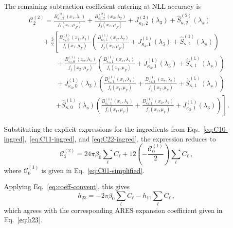 The remaining subtraction coefficient entering at NLL accuracy is
\begin{equation}
\begin{aligned}
&\mathcal{C}^{(2)}_2=\frac{B_{\kappa_1,2}^{(2)}(x_1,\lambda_1)}{f_i(x_1,\mu_F)}+\frac{B_{\kappa_2,2}^{(2)}(x_2,\lambda_2)}{f_j(x_2,\mu_F)}+
    J_{\kappa_3,2}^{(2)}(\lambda_3)
    +\widehat{S}^{(2)}_{\kappa,2}\left(\lambda_s\right)\\[0.5ex]
    &\qquad +\frac{3}{2}\left[\frac{B_{\kappa_1,0}^{(1)}(x_1,\lambda_1)}{f_i(x_1,\mu_F)}\left(\frac{B_{\kappa_2,1}^{(1)}(x_2,\lambda_2)}{f_j(x_2,\mu_F)}+J_{\kappa_3,1}^{(1)}(\lambda_3)
    +\widehat{S}^{(1)}_{\kappa,1}\left(\lambda_s\right)\right)\right.\\[0.5ex]
    &\qquad\qquad +\frac{B_{\kappa_2,0}^{(1)}(x_2,\lambda_1)}{f_j(x_2,\mu_F)}\left(\frac{B_{\kappa_1,1}^{(1)}(x_1,\lambda_1)}{f_i(x_1,\mu_F)}+J_{\kappa_3,1}^{(1)}(\lambda_3)
    +\widehat{S}^{(1)}_{\kappa,1}\left(\lambda_s\right)\right)\\[0.5ex]
    &\qquad\qquad +J_{\kappa_3,0}^{(1)}(\lambda_3)\left(\frac{B_{\kappa_1,1}^{(1)}(x_1,\lambda_1)}{f_i(x_1,\mu_F)}+\frac{B_{\kappa_2,1}^{(1)}(x_2,\lambda_2)}{f_j(x_2,\mu_F)}+\widehat{S}^{(1)}_{\kappa,1}\left(\lambda_s\right)\right)\\[0.5ex]
    &\qquad\qquad \left.+\widehat{S}^{(1)}_{\kappa,0}\left(\lambda_s\right)\left(\frac{B_{\kappa_1,1}^{(1)}(x_1,\lambda_1)}{f_i(x_1,\mu_F)}+\frac{B_{\kappa_2,1}^{(1)}(x_2,\lambda_2)}{f_j(x_2,\mu_F)}+J_{\kappa_3,1}^{(1)}(\lambda_3)\right)\right]\,.
 \end{aligned}
\end{equation}

Substituting the explicit expressions for the ingredients from
Eqs.~\eqref{eq:C10-ingred},~\eqref{eq:C11-ingred}, and
\eqref{eq:C22-ingred}, the expression reduces to
\begin{equation}
    \mathcal{C}_{2}^{(2)} = 24\pi\beta_0 \sum_{\ell}C_{\ell}
    +12\left(-\frac{\mathcal{C}^{(1)}_{0}}{2}\right)\sum_{\ell}C_{\ell}\,,
\end{equation}
where $\mathcal{C}^{(1)}_0$ is given in Eq.~\eqref{eq:C01-simplified}.

Applying Eq.~\eqref{eq:coeff-convent}, this gives
\begin{equation}
    h_{23}=-2\pi\beta_{0}\sum_{\ell}C_{\ell}-h_{11}\sum_{\ell}C_{\ell}\,,
\end{equation}
which agrees with the corresponding \textsc{ARES} expansion coefficient
given in Eq.~\eqref{eq:h23}.

